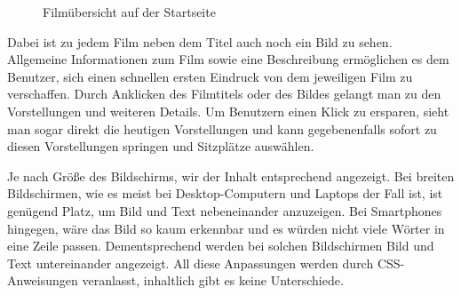 \begin{figure}[ht]
	\caption{Filmübersicht auf der Startseite}
\end{figure}

Dabei ist zu jedem Film neben dem Titel auch noch ein Bild zu sehen.
Allgemeine Informationen zum Film sowie eine Beschreibung ermöglichen es dem Benutzer, sich einen schnellen ersten Eindruck von dem jeweiligen Film zu verschaffen.
Durch Anklicken des Filmtitels oder des Bildes gelangt man zu den Vorstellungen und weiteren Details.
Um Benutzern einen Klick zu ersparen, sieht man sogar direkt die heutigen Vorstellungen und kann gegebenenfalls sofort zu diesen Vorstellungen springen und Sitzplätze auswählen.

Je nach Größe des Bildschirms, wir der Inhalt entsprechend angezeigt.
Bei breiten Bildschirmen, wie es meist bei Desktop-Computern und Laptops der Fall ist, ist genügend Platz, um Bild und Text nebeneinander anzuzeigen.
Bei Smartphones hingegen, wäre das Bild so kaum erkennbar und es würden nicht viele Wörter in eine Zeile passen.
Dementsprechend werden bei solchen Bildschirmen Bild und Text untereinander angezeigt.
All diese Anpassungen werden durch \acs{CSS}-Anweisungen veranlasst, inhaltlich gibt es keine Unterschiede.